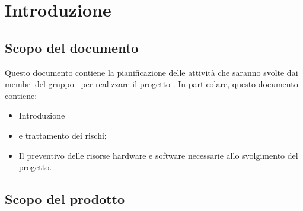 \section{Introduzione}
\subsection{Scopo del documento}
Questo documento contiene la pianificazione delle attività che saranno svolte dai membri del gruppo \gruppo\ per realizzare il progetto \progetto. In particolare, questo documento contiene:

	\begin{itemize}
		\item Introduzione
		\item {} e trattamento dei rischi;
		\item Il preventivo delle risorse hardware e software necessarie allo svolgimento del progetto.
	\end{itemize}
	
\subsection{Scopo del prodotto}
\scopoProdotto
%



